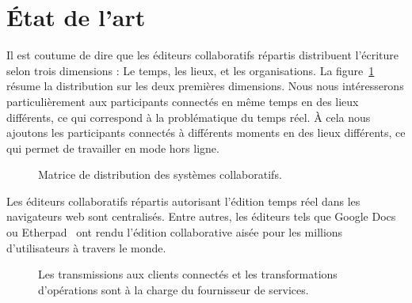
\section{État de l'art}
\label{editor:sec:stateoftheart}

Il est coutume de dire que les éditeurs collaboratifs répartis distribuent
l'écriture selon trois dimensions : Le temps, les lieux, et les organisations.
La figure~\ref{editor:fig:groupware} résume la distribution sur les deux
premières dimensions.  Nous nous intéresserons particulièrement aux participants
connectés en même temps en des lieux différents, ce qui correspond à la
problématique du temps réel. À cela nous ajoutons les participants connectés à
différents moments en des lieux différents, ce qui permet de travailler en mode
hors ligne.

\begin{figure}
  \begin{center}
    
    \caption[Matrice de distribution des systèmes collaboratifs] {
      \label{editor:fig:groupware} Matrice de distribution des systèmes
      collaboratifs.}
  \end{center}
\end{figure}

Les éditeurs collaboratifs répartis autorisant l'édition temps réel dans les
navigateurs web sont centralisés. Entre autres, les éditeurs tels que Google
Docs~\cite{googledocs} ou Etherpad~\cite{etherpad} ont rendu l'édition
collaborative aisée pour les millions d'utilisateurs à travers le monde.

\begin{figure}
  \begin{center}
    
    \caption[Fonctionnement des éditeurs centralisés]
    {\label{editor:fig:serviceprovider} Les transmissions aux clients connectés
      et les transformations d'opérations sont à la charge du fournisseur de
      services.}
  \end{center}
\end{figure}

